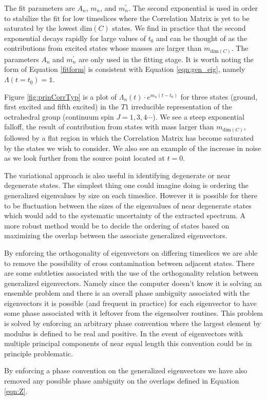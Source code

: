The fit parameters are $A_n$, $m_n$, and $m_n^{\prime}$.  The second exponential is used in order to stabilize the fit for low timeslices where the Correlation Matrix is yet to be saturated by the lowest $\mathrm{dim}(C)$ states. We find in practice that the second exponential decays rapidly for large values of $t_0$ and can be thought of as the contributions from excited states whose masses are larger than $m_{\mathrm{dim}(C)}$.  The parameters $A_n$ and $m_n^{\prime}$ are only used in the fitting stage. It is worth noting the form of Equation \ref{fitform} is consistent with Equation \ref{eqn:gen_eig}, namely $\Lambda(t=t_0) = \mathbb{1}$.
\par
Figure \ref{fig:prinCorrTyp} is a plot of $\Lambda_n(t) \cdot e^{m_n(t - t_0)}$ for three states (ground, first excited and fifth excited) in the $T1$ irreducible representation of the octrahedral group (continuum spin $J = 1,3,4\cdots$).  We see a steep exponential falloff, the result of contribution from states with mass larger than $m_{\mathrm{dim}(C)}$, followed by a flat region in which the Correlation Matrix has become saturated by the states we wish to consider.  We also see an example of the increase in noise as we look further from the source point located at $t = 0$.
\par
The variational approach is also useful in identifying degenerate or near degenerate states.  The simplest thing one could imagine doing is ordering the generalized eigenvalues by size on each timeslice. However it is possible for there to be fluctuation between the sizes of the eigenvalues of near degenerate states which would add to the systematic uncertainty of the extracted spectrum. A more robust method would be to decide the ordering of states based on maximizing the overlap between the associate generalized eigenvectors.
\par
By enforcing the orthogonality of eigenvectors on differing timeslices we are able to remove the possibility of cross contamination between adjacent states. There are some subtleties associated with the use of the orthogonality relation between generalized eigenvectors. Namely since the computer doesn't know it is solving an ensemble problem and there is an overall phase ambiguity associated with the eigenvectors it is possible (and frequent in practice) for each eigenvector to have some phase associated with it leftover from the eigensolver routines. This problem is solved by enforcing an arbitrary phase convention where the largest element by modulus is defined to be real and positive. In the event of eigenvectors with multiple principal components of near equal length this convention could be in principle problematic. 
\par
By enforcing a phase convention on the generalized eigenvectors we have also removed any possible phase ambiguity on the overlaps defined in Equation \ref{eqn:Z}. 
\par

